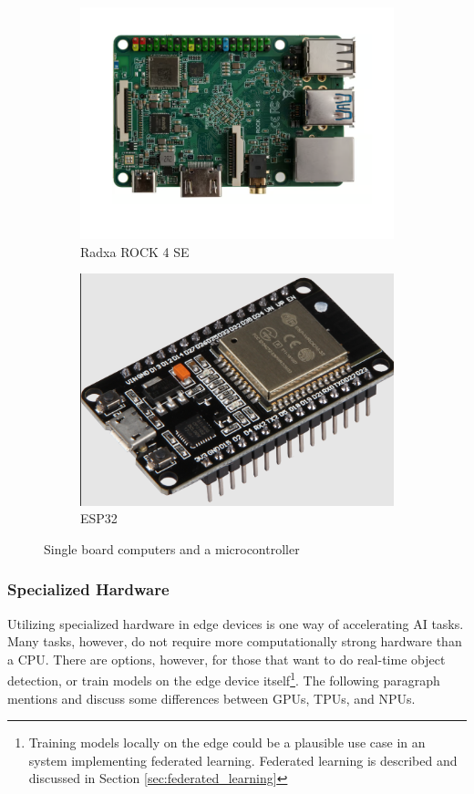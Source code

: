 \begin{figure}[H]
\begin{subfigure}{0.24\textwidth}
        \includegraphics[width=\textwidth]{Images/Hardware/rock4.png}
        \caption{Radxa ROCK 4 SE}
        \label{fig:rock4}
    \end{subfigure}
    \hfill
    \begin{subfigure}{0.24\textwidth}
        \includegraphics[width=\textwidth]{Images/Hardware/esp32.png}
        \caption{ESP32}
        \label{fig:ESP32}
    \end{subfigure}
    \caption{Single board computers and a microcontroller}
\end{figure}

\subsubsection{Specialized Hardware}
\label{sec:specialized_hardware}
Utilizing specialized hardware in edge devices is one way of accelerating AI tasks. Many tasks, however, do not require more computationally strong hardware than a CPU. There are options, however, for those that want to do real-time object detection, or train models on the edge device itself\footnote{Training models locally on the edge could be a plausible use case in an system implementing federated learning. Federated learning is described and discussed in Section \ref{sec:federated_learning}}. The following paragraph mentions and discuss some differences between GPUs, TPUs, and NPUs. 

